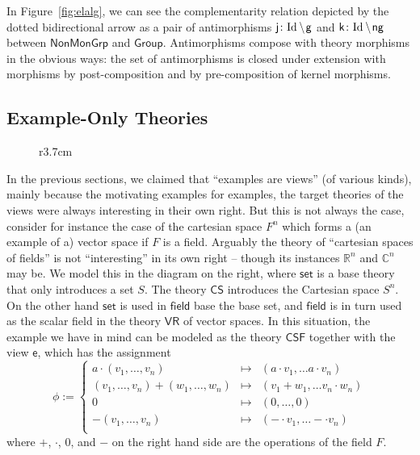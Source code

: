 \documentclass[11pt]{bluenote}
\def\setdiff#1#2{#1\kern.2em\backslash\kern.1em #2}
\def\cn#1{\mathsf{#1}}
\def\id{\text{Id}}
\begin{document}
In Figure~\ref{fig:elalg}, we can see the complementarity relation depicted by the dotted
bidirectional arrow as a pair of antimorphisms $\cn{j}\colon\setdiff\id{\cn{g}}$ and
$\cn{k}\colon\setdiff\id{\cn{ng}}$ between $\cn{NonMonGrp}$ and $\cn{Group}$. Antimorphisms
compose with theory morphisms in the obvious ways: the set of antimorphisms is closed
under extension with morphisms by post-composition and by pre-composition of kernel
morphisms.

\subsection{Example-Only Theories}
\begin{wrapfigure}r{3.7cm}\vspace*{-1em}
  \vspace*{-1em}
\end{wrapfigure}
In the previous sections, we claimed that ``examples are views'' (of various kinds),
mainly because the motivating examples for examples, the target theories of the views were
always interesting in their own right. But this is not always the case, consider for
instance the case of the cartesian space $F^n$ which forms a (an example of a) vector
space if $F$ is a field. Arguably the theory of ``cartesian spaces of fields'' is not
``interesting'' in its own right -- though its instances $\mathbb{R}^n$ and $\mathbb{C}^n$
may be. We model this in the diagram on the right, where $\cn{set}$ is a base theory that
only introduces a set $S$. The theory $\cn{CS}$ introduces the Cartesian space $S^n$. On
the other hand $\cn{set}$ is used in $\cn{field}$ base the base set, and $\cn{field}$ is
in turn used as the scalar field in the theory $\cn{VR}$ of vector spaces. In this
situation, the example we have in mind can be modeled as the theory $\cn{CSF}$ together
with the view $\cn{e}$, which has the assignment
\[
\phi:=\left\{\begin{array}{rcl}
a\cdot(v_1,\ldots,v_n) & \mapsto & (a\cdot v_1,\ldots a\cdot v_n)\\
(v_1,\ldots,v_n)+(w_1,\ldots,w_n) & \mapsto & (v_1+w_1,\ldots v_n\cdot w_n)\\
0 & \mapsto & (0,\ldots,0) \\
-(v_1,\ldots,v_n) & \mapsto & (-\cdot v_1,\ldots -\cdot v_n)\\
             \end{array}\right.
\]
where $+$, $\cdot$, $0$, and $-$ on the right hand side are the operations of the field
$F$.
\end{document}
